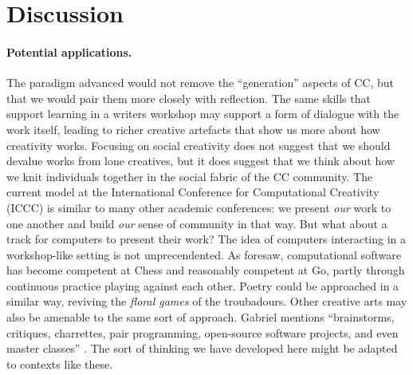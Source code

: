 \section{Discussion} \label{sec:discussion}

\paragraph{Potential applications.}
The paradigm advanced would not remove the ``generation''
aspects of CC, but that we would pair them more closely with
reflection. The same skills that
support learning in a writers workshop may support a form of dialogue
with the work itself, leading to richer creative artefacts that show
us more about how creativity works.
%
%
Focusing on social creativity does not suggest that we should
devalue works from lone creatives, but it does suggest that we think
about how we knit individuals together in the social fabric of the CC
community.  The current model at the International Conference for
Computational Creativity (ICCC) is similar to many other academic
conferences: 
we present \emph{our} work to
one another and build \emph{our} sense of community in that way. But
what about a track for computers to present their work?
%
The idea of computers interacting in a workshop-like setting is not unprecendented.
As \cite{turing-intelligent} foresaw, computational software has become competent
at Chess and reasonably competent at Go, partly through continuous practice playing against each other.
Poetry could be approached in a similar way, reviving the \emph{floral games} of the troubadours.
Other creative arts may also be amenable to the same sort of approach.  Gabriel mentions
``brainstorms, critiques, charrettes, pair programming, open-source software projects, and
even master classes'' \cite[p. 11]{gabriel2002writer}.  The sort of thinking we
have developed here might be adapted to contexts like these.

